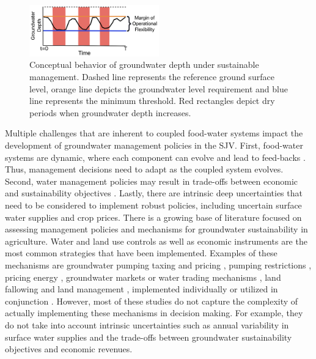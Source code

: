 \documentclass[a4paper,fleqn]{cas-sc}
\begin{document}
 \begin{figure}[ht]
    \includegraphics[width=0.5\textwidth,center]{conceptual_sgma_policy.jpg}
    \caption{Conceptual behavior of groundwater depth under sustainable management. Dashed line represents the reference ground surface level, orange line depicts the groundwater level requirement and blue line represents the minimum threshold. Red rectangles depict dry periods when groundwater depth increases.}
    \label{fig:1}
\end{figure}

Multiple challenges that are inherent to coupled food-water systems \citep{polhill_modelling_2016} impact the development of groundwater management policies in the SJV. First, food-water systems are dynamic, where each component can evolve and lead to feed-backs \citep{filatova_regime_2016}. Thus, management decisions need to adapt as the coupled system evolves. Second, water management policies may result in trade-offs between economic and sustainability objectives \citep{mcdermid_minimizing_2021,stone_economic_2022,torhan_tradeoffs_2022,null_pareto_2021}. Lastly, there are intrinsic deep uncertainties \citep{stirling_keep_2010} that need to be considered to implement robust policies, including uncertain surface water supplies and crop prices. There is a growing base of literature focused on assessing management policies and mechanisms for groundwater sustainability in agriculture. Water and land use controls as well as economic instruments are the most common strategies that have been implemented. Examples of these mechanisms are groundwater pumping taxing and pricing  \citep{madani_exogenous_2013,mulligan_assessing_2014,stone_economic_2022,wang_development_2023}, pumping restrictions \citep{young_hydrologic-economic_2021,lan_performance_2021,macewan_hydroeconomic_2017,rodriguez-flores_global_2022,wang_development_2023}, pricing energy \citep{hrozencik_impacts_2022}, groundwater markets or water trading mechanisms \citep{khan_effect_2019,kuwayama_regulation_2013,safari_market-based_2023}, land fallowing \citep{van_schmidt_linkages_2022} and land management \citep{bourque_balancing_2019,li_evaluation_2018,bryant_shaping_2020}, implemented individually or utilized in conjunction \citep{graveline_combining_2020,hrozencik_heterogeneous_2017}. However, most of these studies do not capture the complexity of actually implementing these mechanisms in decision making. For example, they do not take into account intrinsic uncertainties such as annual variability in surface water supplies and the trade-offs between groundwater sustainability objectives and economic revenues. 
\end{document}
